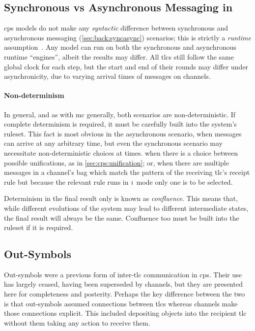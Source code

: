 
\subsection{\label{sec:cps:syncasync}Synchronous vs Asynchronous Messaging in }

\gls{cps} models do not make any \emph{syntactic} difference between synchronous and asynchronous messaging (\cref{sec:back:syncasync}) scenarios;
this is strictly a \emph{runtime} assumption~\cite{Nicolescu2012}.
Any model can run on both the synchronous and asynchronous runtime ``engines'', albeit the results may differ.  All \glspl{tlc} still follow the same global clock for each step, but the start and end of their rounds may differ under asynchronicity, due to varying arrival times of messages on channels.

\paragraph{Non-determinism}
In general, and as with \gls{mc} generally, both scenarios are non-deterministic.  If complete determinism is required, it must be carefully built into the system's \gls{ruleset}.  This fact is most obvious in the asynchronous scenario, when messages can arrive at any arbitrary time, but even the synchronous scenario may necessitate non-deterministic choices at times. \Eg{} when there is a choice between possible
unifications, as in \cref{sec:cps:unification}; or, when there are multiple messages in a channel’s bag
which match the pattern of the receiving \gls{tlc}’s receipt rule but because the relevant rule runs in \({\scriptstyle 1}\) mode only one is to be selected.

Determinism in the final result only is known as \emph{confluence}.  This means that, while different evolutions of the system may lead to different intermediate states, the final result will always be the same.  Confluence too must be built into the \gls{ruleset} if it is required.

\subsection{\label{sec:cps:outsymbols}Out-Symbols}
Out-symbols were a previous form of inter-\gls{tlc} communication in \gls{cps}.  Their use has largely ceased, having been superseded by channels, but they are presented here for completeness and posterity.  Perhaps the key difference between the two is that out-symbols assumed connections between \glspl{tlc} whereas channels make those connections explicit.  This included depositing objects into the recipient \gls{tlc} without them taking any action to receive them.

